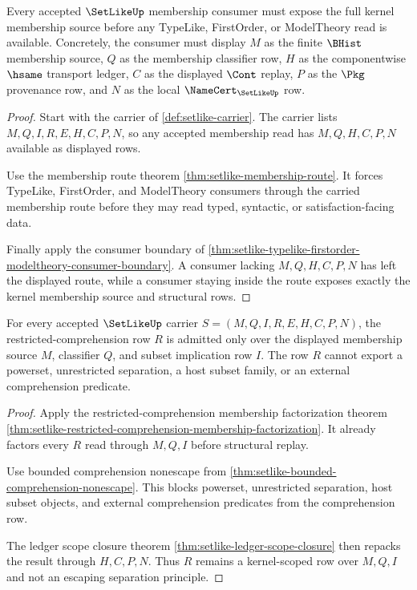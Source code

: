 \begin{theorem}
\label{thm:setlike-kernel-membership-source-totality}
Every accepted $\SetLikeUp$ membership consumer must expose the full kernel membership source before any TypeLike, FirstOrder, or ModelTheory read is available. Concretely, the consumer must display $M$ as the finite $\BHist$ membership source, $Q$ as the membership classifier row, $H$ as the componentwise $\hsame$ transport ledger, $C$ as the displayed $\Cont$ replay, $P$ as the $\Pkg$ provenance row, and $N$ as the local $\NameCert_{\SetLikeUp}$ row.
\end{theorem}
\begin{proof}
Start with the carrier of \autoref{def:setlike-carrier}. The carrier lists $M,Q,I,R,E,H,C,P,N$, so any accepted membership read has $M,Q,H,C,P,N$ available as displayed rows.

Use the membership route theorem \autoref{thm:setlike-membership-route}. It forces TypeLike, FirstOrder, and ModelTheory consumers through the carried membership route before they may read typed, syntactic, or satisfaction-facing data.

Finally apply the consumer boundary of \autoref{thm:setlike-typelike-firstorder-modeltheory-consumer-boundary}. A consumer lacking $M,Q,H,C,P,N$ has left the displayed route, while a consumer staying inside the route exposes exactly the kernel membership source and structural rows.
\end{proof}

\begin{theorem}
\label{thm:setlike-restricted-comprehension-kernel-scope}
For every accepted $\SetLikeUp$ carrier $S=(M,Q,I,R,E,H,C,P,N)$, the restricted-comprehension row $R$ is admitted only over the displayed membership source $M$, classifier $Q$, and subset implication row $I$. The row $R$ cannot export a powerset, unrestricted separation, a host subset family, or an external comprehension predicate.
\end{theorem}
\begin{proof}
Apply the restricted-comprehension membership factorization theorem \autoref{thm:setlike-restricted-comprehension-membership-factorization}. It already factors every $R$ read through $M,Q,I$ before structural replay.

Use bounded comprehension nonescape from \autoref{thm:setlike-bounded-comprehension-nonescape}. This blocks powerset, unrestricted separation, host subset objects, and external comprehension predicates from the comprehension row.

The ledger scope closure theorem \autoref{thm:setlike-ledger-scope-closure} then repacks the result through $H,C,P,N$. Thus $R$ remains a kernel-scoped row over $M,Q,I$ and not an escaping separation principle.
\end{proof}

